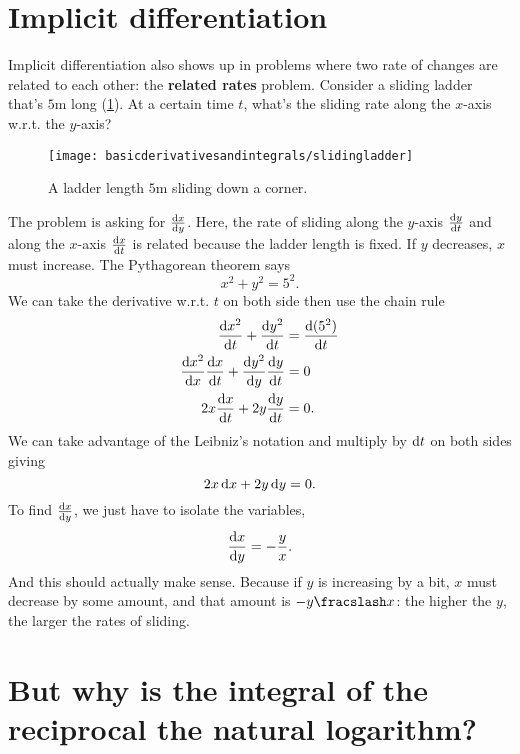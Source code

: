 \section{Implicit differentiation}

Implicit differentiation also shows up in problems where two rate of changes are related to each other: the \textbf{related rates} problem. Consider a sliding ladder that's $5\unit{\meter}$ long (\cref{fig:slidingladder}). At a certain time $t$, what's the sliding rate along the $x$-axis w.r.t. the $y$-axis?

\begin{figure}
    \centering
    \texttt{[image: basicderivativesandintegrals/slidingladder]}
    \caption{A ladder length $5\unit{\meter}$ sliding down a corner.}
    \label{fig:slidingladder}
\end{figure}

The problem is asking for $\odv{x}{y}$. Here, the rate of sliding along the $y$-axis $\odv{y}{t}$ and along the $x$-axis $\odv{x}{t}$ is related because the ladder length is fixed. If $y$ decreases, $x$ must increase. The Pythagorean theorem says
\begin{equation}
    x^2 + y^2 = 5^2.
\end{equation}
We can take the derivative w.r.t. $t$ on both side then use the chain rule
\begin{align*}
    \odv{x^2}{t} + \odv{y^2}{t} &= \odv{(5^2)}{t} \\
    \odv{x^2}{x}\odv{x}{t} + \odv{y^2}{y}\odv{y}{t} &= 0 \\
    2x\odv{x}{t} + 2y\odv{y}{t} &= 0.
\end{align*}
We can take advantage of the Leibniz's notation and multiply by $\odif{t}$ on both sides giving
\begin{equation*}
    2x\odif{x} + 2y\odif{y} = 0.
\end{equation*}
To find $\odv{x}{y}$, we just have to isolate the variables,
\begin{align*}
    \odv{x}{y} = -\frac{y}{x}.
\end{align*}
And this should actually make sense. Because if $y$ is increasing by a bit, $x$ must decrease by some amount, and that amount is $-\flatfrac{y}{x}$: the higher the $y$, the larger the rates of sliding.

\section{But why is the integral of the reciprocal the natural logarithm?}
\label{sec:integralofthereciprocal}

